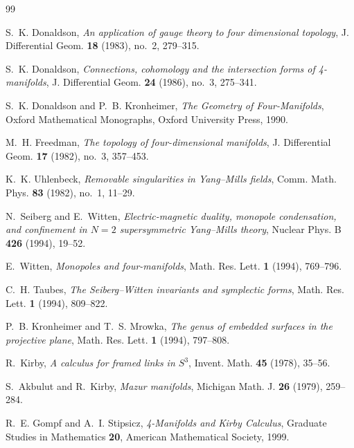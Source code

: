 \documentclass[12pt,a4paper]{amsart}
\theoremstyle{definition}
\theoremstyle{remark}
\begin{document}
\begin{thebibliography}{99}

S.~K. Donaldson,
\textit{An application of gauge theory to four dimensional topology},
J. Differential Geom. \textbf{18} (1983), no.~2, 279--315.

S.~K. Donaldson,
\textit{Connections, cohomology and the intersection forms of 4-manifolds},
J. Differential Geom. \textbf{24} (1986), no.~3, 275--341.

S.~K. Donaldson and P.~B. Kronheimer,
\textit{The Geometry of Four-Manifolds},
Oxford Mathematical Monographs, Oxford University Press, 1990.

M.~H. Freedman,
\textit{The topology of four-dimensional manifolds},
J. Differential Geom. \textbf{17} (1982), no.~3, 357--453.

K.~K. Uhlenbeck,
\textit{Removable singularities in Yang--Mills fields},
Comm. Math. Phys. \textbf{83} (1982), no.~1, 11--29.

N.~Seiberg and E.~Witten,
\textit{Electric-magnetic duality, monopole condensation, and confinement in
$N=2$ supersymmetric Yang--Mills theory},
Nuclear Phys. B \textbf{426} (1994), 19--52.

E.~Witten,
\textit{Monopoles and four-manifolds},
Math. Res. Lett. \textbf{1} (1994), 769--796.

C.~H. Taubes,
\textit{The Seiberg--Witten invariants and symplectic forms},
Math. Res. Lett. \textbf{1} (1994), 809--822.

P.~B. Kronheimer and T.~S. Mrowka,
\textit{The genus of embedded surfaces in the projective plane},
Math. Res. Lett. \textbf{1} (1994), 797--808.

R.~Kirby,
\textit{A calculus for framed links in $S^3$},
Invent. Math. \textbf{45} (1978), 35--56.

S.~Akbulut and R.~Kirby,
\textit{Mazur manifolds},
Michigan Math. J. \textbf{26} (1979), 259--284.

R.~E. Gompf and A.~I. Stipsicz,
\textit{4-Manifolds and Kirby Calculus},
Graduate Studies in Mathematics \textbf{20},
American Mathematical Society, 1999.

\end{thebibliography}
\end{document}
